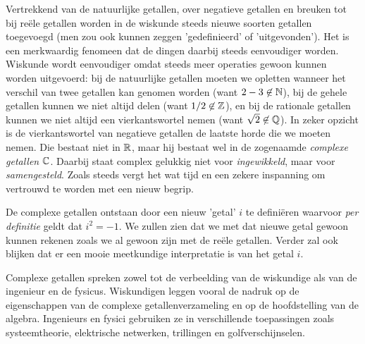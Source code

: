 \documentclass{ximera}
\begin{document}
\begin{xmuitweiding} \nl
Vertrekkend van de natuurlijke getallen, over negatieve getallen en breuken tot bij reële getallen worden in de wiskunde steeds nieuwe soorten getallen toegevoegd (men zou ook kunnen zeggen 'gedefinieerd' of 'uitgevonden'). Het is een merkwaardig fenomeen dat de dingen daarbij steeds eenvoudiger worden. Wiskunde wordt eenvoudiger omdat steeds meer operaties gewoon kunnen worden uitgevoerd: bij de natuurlijke getallen moeten we opletten wanneer het verschil van twee getallen kan genomen worden (want $2-3 \not\in\mathbb{N}$), bij de gehele getallen kunnen we niet altijd delen (want $1/2\not\in\mathbb{Z}$), en bij de rationale getallen kunnen we niet altijd een vierkantswortel nemen (want $\sqrt{2}\not\in\mathbb{Q}$). In zeker opzicht is de vierkantswortel van negatieve getallen de laatste horde die we moeten nemen. Die bestaat niet in $\mathbb{R}$, maar hij bestaat wel in de zogenaamde \textit{complexe getallen} $\mathbb{C}$. Daarbij staat complex gelukkig niet voor \textit{ingewikkeld}, maar voor \textit{samengesteld}. Zoals steeds vergt het wat tijd en een zekere inspanning om vertrouwd te worden met een nieuw begrip.

De complexe getallen ontstaan door een nieuw 'getal' $i$ te definiëren waarvoor \textit{per definitie} geldt dat $i^2=-1$. We zullen zien dat we met dat nieuwe getal gewoon kunnen rekenen zoals we al gewoon zijn met de reële getallen. Verder zal ook blijken dat er een mooie meetkundige interpretatie is van het getal $i$.


Complexe getallen spreken zowel tot de verbeelding van de wiskundige als van de ingenieur en de fysicus.  Wiskundigen leggen vooral de nadruk op de eigenschappen van de complexe getallenverzameling en op de hoofdstelling van de algebra. Ingenieurs en fysici  gebruiken ze in verschillende toepassingen zoals systeemtheorie, elektrische netwerken, trillingen en golfverschijnselen.
\end{xmuitweiding}
\end{document}
